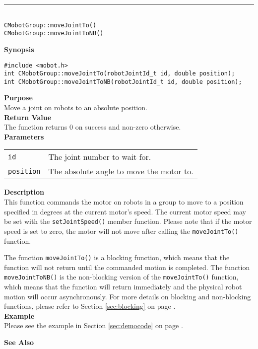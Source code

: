 \noindent
\vspace{5pt}
\rule{4.5in}{0.015in}\\
\noindent
{\LARGE \texttt{CMobotGroup::moveJointTo()}}\\
{\LARGE \texttt{CMobotGroup::moveJointToNB()}}\\
{}

\noindent
{\bf Synopsis}\\
\begin{verbatim}
#include <mobot.h>
int CMobotGroup::moveJointTo(robotJointId_t id, double position);
int CMobotGroup::moveJointToNB(robotJointId_t id, double position);
\end{verbatim}

\noindent
{\bf Purpose}\\
Move a joint on robots to an absolute position.\\

\noindent
{\bf Return Value}\\
The function returns 0 on success and non-zero otherwise.\\

\noindent
{\bf Parameters}\\
\vspace{-0.1in}
\begin{description}
\item               
\begin{tabular}{p{10 mm}p{145 mm}}
\texttt{id} & The joint number to wait for. \\
\texttt{position} & The absolute angle to move the motor to.  \\
\end{tabular}
\end{description}

\noindent
{\bf Description}\\
This function commands the motor on robots in a group to move to a position specified in degrees at
the current motor's speed. The current motor speed may be set with the
\texttt{setJointSpeed()} member function. Please note that if the motor speed
is set to zero, the motor will not move after calling the
\texttt{moveJointTo()} function. 

The function \texttt{moveJointTo()} is a blocking function, which means that 
the function will not return until the commanded motion is 
completed. The function \texttt{moveJointToNB()} is the non-blocking version of
the \texttt{moveJointTo()} function, which means that the function will return
immediately and the physical robot motion will occur asynchronously. For
more details on blocking and non-blocking functions, please refer to 
Section \ref{sec:blocking} on page \pageref{sec:blocking}.\\

\noindent
{\bf Example}\\
Please see the example in Section \ref{sec:democode} on page \pageref{sec:democode}.\\
\noindent

\noindent
{\bf See Also}\\

